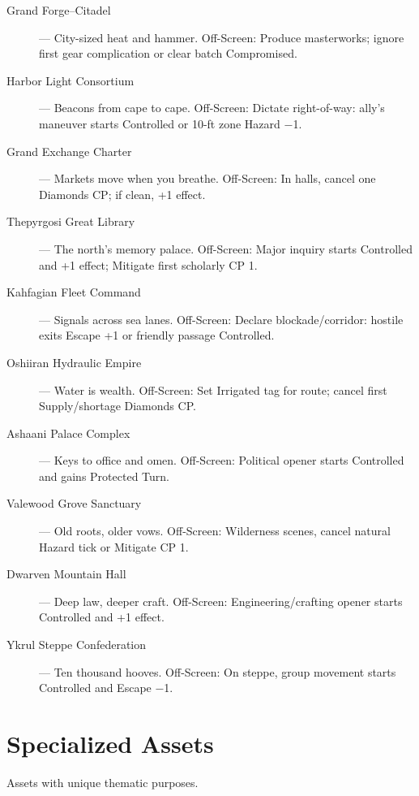 \begin{description}
  \item[Grand Forge–Citadel] — City-sized heat and hammer. Off-Screen: Produce masterworks; ignore first gear complication or clear batch Compromised.
  \item[Harbor Light Consortium] — Beacons from cape to cape. Off-Screen: Dictate right-of-way: ally's maneuver starts Controlled or 10-ft zone Hazard −1.
  \item[Grand Exchange Charter] — Markets move when you breathe. Off-Screen: In halls, cancel one Diamonds CP; if clean, +1 effect.
  \item[Thepyrgosi Great Library] — The north's memory palace. Off-Screen: Major inquiry starts Controlled and +1 effect; Mitigate first scholarly CP 1.
  \item[Kahfagian Fleet Command] — Signals across sea lanes. Off-Screen: Declare blockade/corridor: hostile exits Escape +1 or friendly passage Controlled.
  \item[Oshiiran Hydraulic Empire] — Water is wealth. Off-Screen: Set Irrigated tag for route; cancel first Supply/shortage Diamonds CP.
  \item[Ashaani Palace Complex] — Keys to office and omen. Off-Screen: Political opener starts Controlled and gains Protected Turn.
  \item[Valewood Grove Sanctuary] — Old roots, older vows. Off-Screen: Wilderness scenes, cancel natural Hazard tick or Mitigate CP 1.
  \item[Dwarven Mountain Hall] — Deep law, deeper craft. Off-Screen: Engineering/crafting opener starts Controlled and +1 effect.
  \item[Ykrul Steppe Confederation] — Ten thousand hooves. Off-Screen: On steppe, group movement starts Controlled and Escape −1.
\end{description}

\section{Specialized Assets}

Assets with unique thematic purposes.

